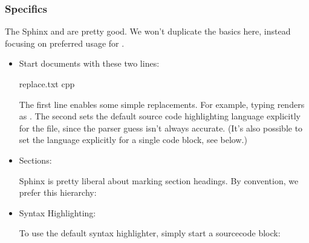\documentclass[letterpaper,10pt,english]{sphinxmanual}
\renewcommand{\sphinxcode}[1]{\texttt{\small{#1}}}
\begin{document}
\subsubsection{ Specifics}
\label{\detokenize{documentation:ns3-specifics}}
The Sphinx  and  are pretty good.  We won’t duplicate
the basics here, instead focusing on preferred usage for .
\begin{itemize}
\item {} 
Start documents with these two lines:

\begin{sphinxVerbatim}[commandchars=\\\{\}]
  replace.txt
  cpp
\end{sphinxVerbatim}

The first line enables some simple replacements.  For example,
typing \sphinxcode{} renders as .
The second sets the default source code highlighting language explicitly
for the file, since the parser guess isn’t always accurate.
(It’s also possible to set the language explicitly for a single code block,
see below.)

\item {} 
Sections:

Sphinx is pretty liberal about marking section headings.  By convention,
we prefer this hierarchy:

\begin{sphinxVerbatim}[commandchars=\\\{\}]
\end{sphinxVerbatim}

\item {} 
Syntax Highlighting:

To use the default syntax highlighter, simply start a sourcecode block:



\end{itemize}
\end{document}
